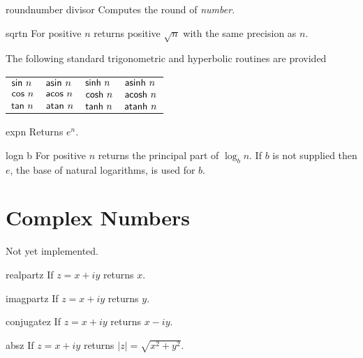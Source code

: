 \begin{functiondef}{round}{number \optional {} divisor}
Computes the round of {\em number}.
\end{functiondef}


\begin{functiondef}{sqrt}{n}
For positive $n$ returns positive $\sqrt{n}$ with the same precision
as $n$.
\end{functiondef}


The following standard trigonometric and hyperbolic routines are provided
\begin{center}
\begin{tabular}{llll}
$\mbox{\sf sin}~n$ & $\mbox{\sf asin}~n$ & $\mbox{\sf sinh}~n$ & $\mbox{\sf asinh}~n$ \\
$\mbox{\sf cos}~n$ & $\mbox{\sf acos}~n$ & $\mbox{\sf cosh}~n$ & $\mbox{\sf acosh}~n$ \\
$\mbox{\sf tan}~n$ & $\mbox{\sf atan}~n$ & $\mbox{\sf tanh}~n$ &
$\mbox{\sf atanh}~n$ 
\end{tabular}
\end{center}

\begin{functiondef}{exp}{n}
Returns $e^n$.
\end{functiondef}

\begin{functiondef}{log}{n \optional b}
For positive $n$ returns the principal part of $\log_b n$.  If $b$ is
not supplied then $e$, the base of natural logarithms, is used for $b$.
\end{functiondef}

\section{Complex Numbers}
\label{Complex:Numbers:Sec}

Not yet implemented.

\begin{functiondef}{realpart}{z}
If $z = x + i y$ returns $x$.
\end{functiondef}

\begin{functiondef}{imagpart}{z}
If $z = x + i y$ returns $y$.
\end{functiondef}

\begin{functiondef}{conjugate}{z}
If $z = x + i y$ returns $x - i y$.
\end{functiondef}

\begin{functiondef}{abs}{z}
If $z = x + i y$ returns $|z| = \sqrt{x^2 + y^2}$.
\end{functiondef}

